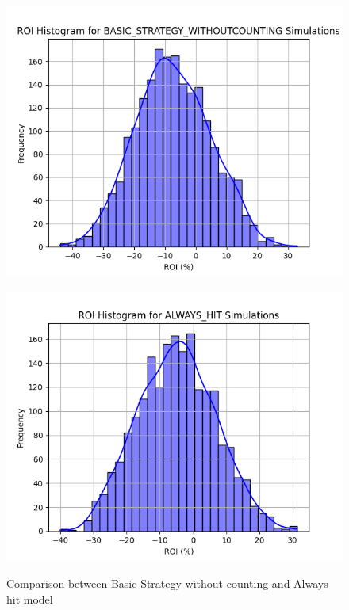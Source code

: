 \documentclass[a4paper,12pt]{report}
\begin{document}
\begin{figure}
    \begin{minipage}{0.45\textwidth}
        \centering
        \includegraphics[scale=0.4]{figures/graphs/bswc_roi.png}
        \label{fig:ah_roi_left}
    \end{minipage}
    \begin{minipage}{0.45\textwidth}
        \includegraphics[scale=0.4]{figures/graphs/ah_roi.png}
        \label{fig:bswc_roi_right}
    \end{minipage}
    \label{fig:comparison_roi}
    \caption{Comparison between Basic Strategy without counting and Always hit model}
\end{figure}
\end{document}
